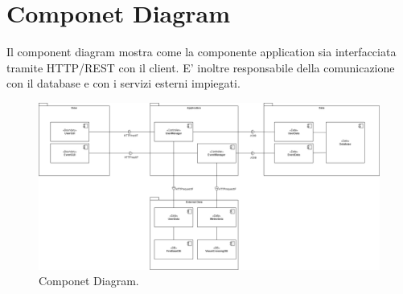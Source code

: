\section{Componet Diagram} 
Il component diagram mostra come la componente application sia interfacciata tramite HTTP/REST con il client. E' inoltre responsabile 
della comunicazione con il database e con i servizi esterni impiegati.
\begin{figure}[h!]
	\centering
	\includegraphics[width=0.8\linewidth]{Iterazione 1/diagrammi/Component.drawio.png}
	\caption{Componet Diagram.}
	\label{fig:ComponentDiagram}
\end{figure}
